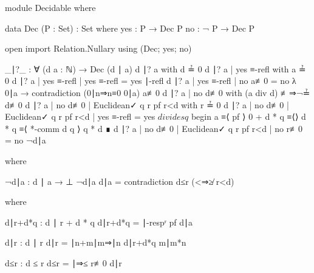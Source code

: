 \documentclass[./Thesis.tex]{subfiles}
\begin{document}
\begin{code}[hide]
  module Decidable where
\end{code}
\begin{code}
    data Dec (P : Set) : Set where
      yes :   P → Dec P
      no  : ¬ P → Dec P
\end{code}
\begin{code}[hide]
  open import Relation.Nullary using (Dec; yes; no)
\end{code}
\begin{code}
  _∣?_ : ∀ (d a : ℕ) → Dec (d ∣ a)
  d ∣? a with d ≟ 0
  d ∣? a | yes ≡-refl with a ≟ 0
  d ∣? a | yes ≡-refl | yes ≡-refl = yes ∣-refl
  d ∣? a | yes ≡-refl | no a≢0 = no λ 0∣a → contradiction (0∣n⇒n≡0 0∣a) a≢0
  d ∣? a | no d≢0 with (a div d) {≢⇒¬≟ d≢0}
  d ∣? a | no d≢0 | Euclidean✓ q r pf r<d with r ≟ 0
  d ∣? a | no d≢0 | Euclidean✓ q r pf r<d | yes ≡-refl =
    yes $ divides q $ begin
      a ≡⟨ pf ⟩
      0 + d * q ≡⟨⟩
      d * q ≡⟨ *-comm d q ⟩
      q * d ∎
  d ∣? a | no d≢0 | Euclidean✓ q r pf r<d | no r≢0 = no ¬d∣a
\end{code}
\begin{code}[hide]
    where
\end{code}
\begin{code}
    ¬d∣a : d ∣ a → ⊥
    ¬d∣a d∣a = contradiction d≤r (<⇒≱ r<d)
\end{code}
\begin{code}[hide]
      where
\end{code}
\begin{code}
      d∣r+d*q : d ∣ r + d * q
      d∣r+d*q = ∣-respʳ pf d∣a
\end{code}
\begin{code}
      d∣r : d ∣ r
      d∣r = ∣n+m∣m⇒∣n d∣r+d*q m∣m*n
\end{code}
\begin{code}
      d≤r : d ≤ r
      d≤r = ∣⇒≤ r≢0 d∣r
\end{code}
\end{document}
